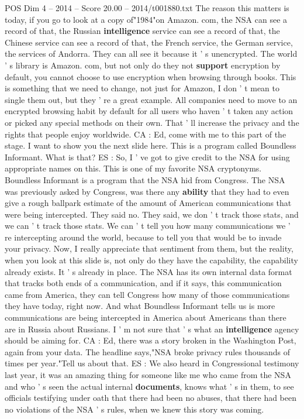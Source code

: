 \begin{textsample}{POS Dim 4 – 2014 – Score 20.00 – 2014/t001880.txt}
The reason this matters is today, if you go to look at a copy of"1984"on Amazon. com, the NSA can see a record of that, the Russian \textbf{intelligence} service can see a record of that, the Chinese service can see a record of that, the French service, the German service, the services of Andorra.
They can all see it because it ' s unencrypted.
The world ' s library is Amazon. com, but not only do they not \textbf{support} encryption by default, you cannot choose to use encryption when browsing through books.
This is something that we need to change, not just for Amazon, I don ' t mean to single them out, but they ' re a great example.
All companies need to move to an encrypted browsing habit by default for all users who haven ' t taken any action or picked any special methods on their own.
That ' ll increase the privacy and the rights that people enjoy worldwide.
CA : Ed, come with me to this part of the stage.
I want to show you the next slide here.
This is a program called Boundless Informant.
What is that?
ES : So, I ' ve got to give credit to the NSA for using appropriate names on this.
This is one of my favorite NSA cryptonyms.
Boundless Informant is a program that the NSA hid from Congress.
The NSA was previously asked by Congress, was there any \textbf{ability} that they had to even give a rough ballpark estimate of the amount of American communications that were being intercepted.
They said no.
They said, we don ' t track those stats, and we can ' t track those stats.
We can ' t tell you how many communications we ' re intercepting around the world, because to tell you that would be to invade your privacy.
Now, I really appreciate that sentiment from them, but the reality, when you look at this slide is, not only do they have the capability, the capability already exists.
It ' s already in place.
The NSA has its own internal data format that tracks both ends of a communication, and if it says, this communication came from America, they can tell Congress how many of those communications they have today, right now.
And what Boundless Informant tells us is more communications are being intercepted in America about Americans than there are in Russia about Russians.
I ' m not sure that ' s what an \textbf{intelligence} agency should be aiming for.
CA : Ed, there was a story broken in the Washington Post, again from your data.
The headline says,"NSA broke privacy rules thousands of times per year."Tell us about that.
ES : We also heard in Congressional testimony last year, it was an amazing thing for someone like me who came from the NSA and who ' s seen the actual internal \textbf{documents}, knows what ' s in them, to see officials testifying under oath that there had been no abuses, that there had been no violations of the NSA ' s rules, when we knew this story was coming.

\end{textsample}
